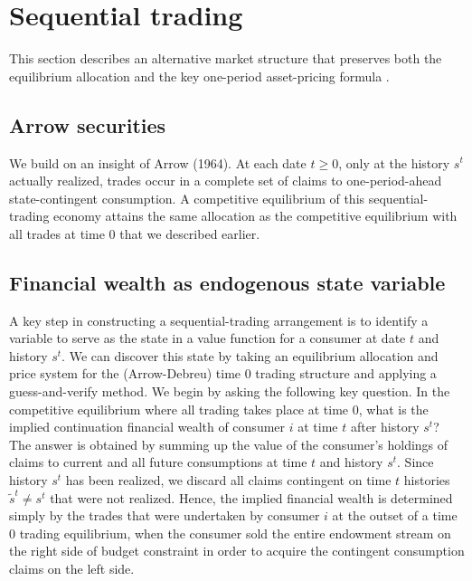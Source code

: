 
\section{Sequential trading}\label{sec:arrowsecurities}%
This section describes an alternative
market structure that preserves both the  equilibrium  allocation
 and the  key one-period asset-pricing formula
.



\subsection{Arrow securities}
We build on an insight of Arrow (1964).
At
each date  $t \geq 0$,  only at the history $s^t$ actually realized,  trades occur in a complete set of claims   to
one-period-ahead state-contingent consumption. A
competitive equilibrium of this sequential-trading economy
  attains the same allocation
as the competitive  equilibrium with all trades at time $0$ that we described earlier.



\subsection{Financial wealth as  endogenous state variable}
A key step in constructing a sequential-trading arrangement is to
identify a variable to serve as the state in a value function for
a consumer at date $t$ and history $s^t$. We can discover this state by taking an
equilibrium allocation and price system for the (Arrow-Debreu)
time $0$ trading structure and applying a guess-and-verify method.
We begin by asking the following key question. In the competitive
equilibrium where all trading takes place at time $0$, what is the implied continuation financial wealth of consumer $i$ at time $t$ after history $s^t$?
The answer is obtained by summing up the value of the consumer's
holdings of claims to current and all future consumptions at  time $t$ and
history $s^t$. Since history $s^t$ has been realized, we discard all
claims contingent on time $t$ histories $\tilde s^t \neq s^t$ that
were not realized. Hence, the implied financial wealth is  determined simply
by the trades that were undertaken by consumer $i$ at the outset of a
time $0$ trading equilibrium, when the consumer  sold  the entire endowment stream on the right side of budget
constraint  in order to acquire the contingent consumption claims
on the left side.

